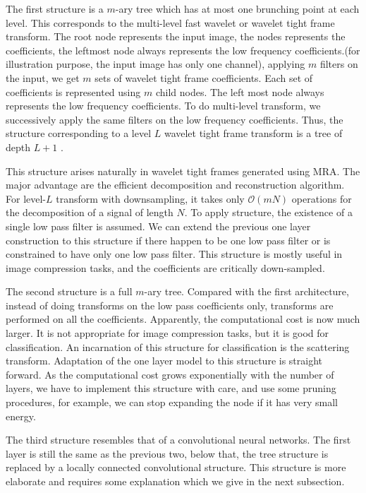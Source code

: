 \documentclass[a4paper]{article}
\begin{document}
The first structure is a $m$-ary tree which has at most one brunching point at each level. This corresponds to the multi-level fast wavelet or wavelet tight frame transform. The root node represents the input image, the nodes represents the coefficients, the leftmost node always represents the low frequency coefficients.(for illustration purpose, the input image has only one channel), applying $m$ filters on the input, we get $m$ sets of wavelet tight frame coefficients. Each set of coefficients is represented using $m$ child nodes. The left most node always represents the low frequency coefficients. To do multi-level transform, we successively apply the same filters on the low frequency coefficients. Thus, the structure corresponding to a level $L$ wavelet tight frame transform is a tree of depth $L+1$ . 

This structure arises naturally in wavelet tight frames generated using MRA. The major advantage are the efficient decomposition and reconstruction algorithm. For level-$L$ transform with downsampling, it takes only $\mathcal O(mN)$ operations for the decomposition of a signal of length $N$. To apply structure, the existence of a single low pass filter is assumed. We can extend the previous one layer construction to this structure if there happen to be one low pass filter or is constrained to have only one low pass filter.  This structure is mostly useful in image compression tasks, and the coefficients are critically down-sampled.

The second structure is a full $m$-ary tree. Compared with the first architecture, instead of doing transforms on the low pass coefficients only,  transforms are performed on all the coefficients.  Apparently, the computational cost is now much larger. It is not appropriate for image compression tasks, but it is good for classification. An incarnation of this structure for classification is the scattering transform\cite{bruna2013invariant}. Adaptation of the one layer model to this structure is straight forward. As the computational cost grows exponentially with the number of layers, we have to implement this structure with care, and use some pruning procedures, for example, we can stop expanding the node if it has very small energy.

The third structure resembles that of a convolutional neural networks. The first layer is still the same as the previous two, below that, the tree structure is replaced by a  locally connected  convolutional structure. This structure is more elaborate and requires some explanation which we give in the next subsection.
\end{document}
